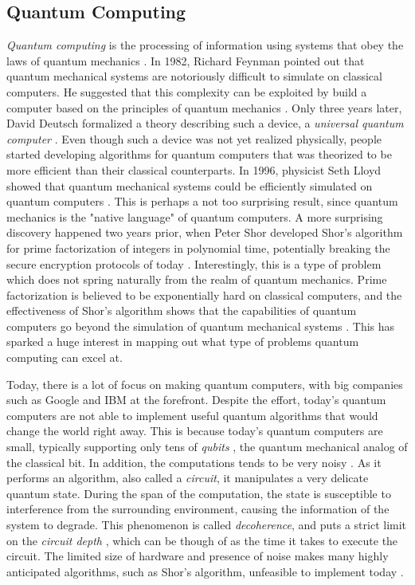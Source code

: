 \subsection{Quantum Computing}\label{sec:Quantum Computing Intro}
\emph{Quantum computing} is the processing of information using systems that obey the laws of quantum mechanics \cite{NielsenQuantum}. In 1982, Richard Feynman pointed out that quantum mechanical systems are notoriously difficult to simulate on classical computers. He suggested that this complexity can be exploited by build a computer based on the principles of quantum mechanics \cite{NielsenQuantum}. Only three years later, David Deutsch formalized a theory describing such a device, a \emph{universal quantum computer} \cite{Deutsch1985QuantumTT}. Even though such a device was not yet realized physically, people started developing algorithms for quantum computers that was theorized to be more efficient than their classical counterparts. In 1996, physicist Seth Lloyd showed that quantum mechanical systems could be efficiently simulated on quantum computers \cite{Lloyd1073}. This is perhaps a not too surprising result, since quantum mechanics is the "native language" of quantum computers. A more surprising discovery happened two years prior, when Peter Shor developed Shor's algorithm for prime factorization of integers in polynomial time, potentially breaking the secure encryption protocols of today \cite{Shor_1997}. Interestingly, this is a type of problem which does not spring naturally from the realm of quantum mechanics. Prime factorization is believed to be exponentially hard on classical computers, and the effectiveness of Shor's algorithm shows that the capabilities of quantum computers go beyond the simulation of quantum mechanical systems \cite{Shor_1997}. 
This has sparked a huge interest in mapping out what type of problems quantum computing can excel at. 


Today, there is a lot of focus on making quantum computers, with big companies such as Google and IBM at the forefront. Despite the effort, today's quantum computers are not able to implement useful quantum algorithms that would change the world right away. This is because today's quantum computers are small, typically supporting only tens of \emph{qubits} \cite{Benedetti_2019}, the quantum mechanical analog of the classical bit. In addition, the computations tends to be very noisy \cite{Preskill_2018}. As it performs an algorithm, also called a \emph{circuit}, it manipulates a very delicate quantum state. During the span of the computation, the state is susceptible to interference from the surrounding environment, causing the information of the system to degrade. This phenomenon is called \emph{decoherence}, and puts a strict limit on the \emph{circuit depth} \cite{saki2019study}, which can be though of as the time it takes to execute the circuit. The limited size of hardware and presence of noise makes many highly anticipated algorithms, such as Shor's algorithm, unfeasible to implement today \cite{Benedetti_2019}. 


